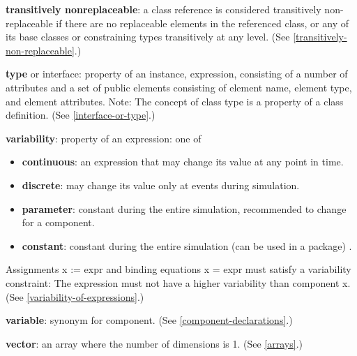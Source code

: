 \textbf{transitively nonreplaceable}: a class reference is considered
transitively non-replaceable if there are no replaceable elements in the
referenced class, or any of its base classes or constraining types
transitively at any level. (See \autoref{transitively-non-replaceable}.)

\textbf{type} or interface: property of an instance, expression, consisting of a number of attributes and a set of public
elements consisting of element name, element type, and element
attributes. Note: The concept of class type is a property of a class
definition. (See \autoref{interface-or-type}.)

\textbf{variability}: property of an expression: one of
\begin{itemize}
\item \textbf{continuous}: an expression that may change its value at any
point in time.
\item \textbf{discrete}: may change its value only at events during
simulation.
\item \textbf{parameter}: constant during the entire simulation, recommended
to change for a component.
\item \textbf{constant}: constant during the entire simulation (can be used
in a package) .
\end{itemize}

Assignments x := expr and binding equations x = expr must satisfy a
variability constraint: The expression must not have a higher
variability than component x. (See \autoref{variability-of-expressions}.)

\textbf{variable}: synonym for component. (See \autoref{component-declarations}.)

\textbf{vector}: an array where the number of dimensions is 1. (See
\autoref{arrays}.)
